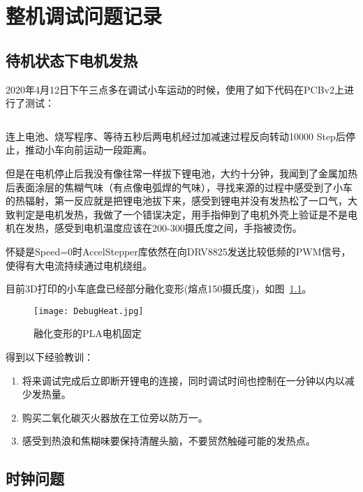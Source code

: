 \chapter{整机调试问题记录}
\label{cha:Debug}

\section{待机状态下电机发热}

2020年4月12日下午三点多在调试小车运动的时候，使用了如下代码在PCBv2上进行了测试：

\inputminted[mathescape, linenos, breaklines]{c}{Code/Stepper-3-Movement/Stepper-3-Movement.ino}

连上电池、烧写程序、等待五秒后两电机经过加减速过程反向转动10000 Step后停止，推动小车向前运动一段距离。

但是在电机停止后我没有像往常一样拔下锂电池，大约十分钟，我闻到了金属加热后表面涂层的焦糊气味（有点像电弧焊的气味），寻找来源的过程中感受到了小车的热辐射，第一反应就是把锂电池拔下来，感受到锂电并没有发热松了一口气，大致判定是电机发热，我做了一个错误决定，用手指伸到了电机外壳上验证是不是电机在发热，感受到电机温度应该在200-300摄氏度之间，手指被烫伤。

怀疑是Speed=0时AccelStepper库依然在向DRV8825发送比较低频的PWM信号，使得有大电流持续通过电机绕组。

目前3D打印的小车底盘已经部分融化变形(熔点150摄氏度)，如图~\ref{fig:DebugHeat}。


\begin{figure}[htbp]
    \centering
    \texttt{[image: DebugHeat.jpg]}
    \caption{融化变形的PLA电机固定}
    \label{fig:DebugHeat}
\end{figure}

得到以下经验教训：

\begin{enumerate}
    \item 将来调试完成后立即断开锂电的连接，同时调试时间也控制在一分钟以内以减少发热量。
    \item 购买二氧化碳灭火器放在工位旁以防万一。
    \item 感受到热浪和焦糊味要保持清醒头脑，不要贸然触碰可能的发热点。
\end{enumerate}


\section{时钟问题}


